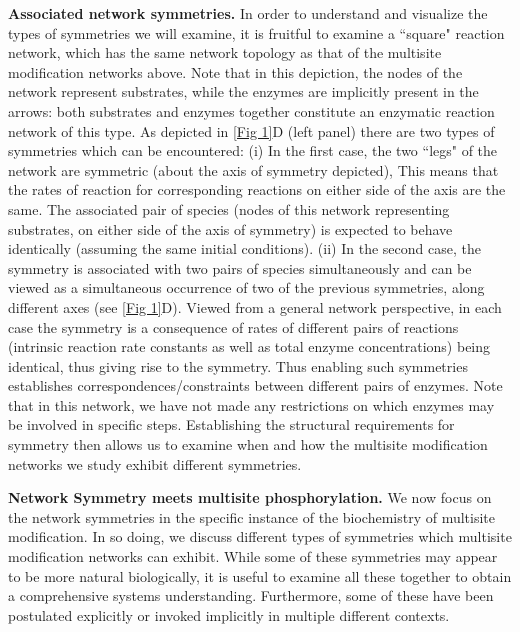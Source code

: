 \documentclass[9pt,lineno]{elife}
\begin{document}
{\bf Associated network symmetries.} In order to understand and visualize the types of symmetries we will examine, it is fruitful to examine a ``square" reaction network, which has the same network topology as that of the multisite modification networks above. Note that in this depiction, the nodes of the network represent substrates, while the enzymes are implicitly present in the arrows: both substrates and enzymes together constitute an enzymatic reaction network of this type.
As depicted in \cref{Fig 1}D (left panel) there are two types of symmetries which can be encountered: (i) In the first case, the two ``legs" of the network are symmetric (about the axis of symmetry depicted),
This means that the rates of reaction for corresponding reactions on either side of the axis are the same. The associated pair of species (nodes of this network representing substrates, on either side of the axis of symmetry) is expected to behave identically (assuming the same initial conditions).
(ii) In the second case, the symmetry is associated with two pairs of species simultaneously and can be viewed as a simultaneous occurrence of two of the previous symmetries, along different axes (see \cref{Fig 1}D).
Viewed from a general network perspective, in each case the symmetry is a consequence of rates of different pairs of reactions (intrinsic reaction rate constants as well as total enzyme concentrations) being identical, thus giving rise to the symmetry.
Thus enabling such symmetries  establishes correspondences/constraints between different pairs of enzymes.
Note that in this network, we have not made any restrictions on which enzymes may be involved in specific steps.
Establishing the structural requirements for symmetry then allows us to examine when and how the multisite modification networks
we study exhibit different symmetries.

{\bf Network Symmetry meets multisite phosphorylation.}   
We now focus on the network symmetries in the specific instance of the biochemistry of multisite modification. In so doing,
we discuss different types of symmetries which multisite modification networks can exhibit. While some of these symmetries may appear to be more natural biologically, it is useful to examine all these together to obtain a comprehensive systems understanding. Furthermore, some of these have been postulated explicitly or invoked implicitly in multiple different contexts.
  
\end{document}

